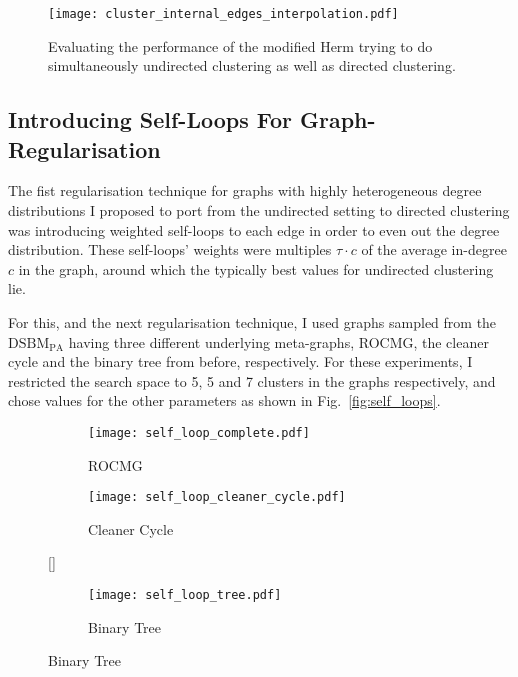 \begin{figure}
\texttt{[image: cluster\_internal\_edges\_interpolation.pdf]}
\caption{Evaluating the performance of the modified Herm trying to do simultaneously undirected 
clustering as well as directed clustering.}
\label{fig:intedginterp}
\end{figure}

\subsection{Introducing Self-Loops For Graph-Regularisation}

The fist regularisation technique for graphs with highly heterogeneous degree distributions I 
proposed to port from the undirected setting to directed clustering was introducing weighted 
self-loops to each edge in order to even out the degree distribution. These self-loops' weights 
were multiples $\tau\cdot c$ of the average in-degree $c$ in the graph, around which the typically 
best values for undirected clustering lie.

For this, and the next regularisation technique, I used graphs sampled from the
 $\mathrm{DSBM}_\mathrm{PA}$ having three different underlying meta-graphs, ROCMG, the cleaner 
cycle and the binary tree from before, respectively. For these experiments, I restricted the 
search space to 5, 5 and 7 clusters in the graphs respectively, and chose values for the other 
parameters as shown in Fig.\ \ref{fig:self_loops}.

\begin{figure}[t!]
\begin{subfigure}[t]{0.45\textwidth}
\begin{center}
\texttt{[image: self\_loop\_complete.pdf]}
\end{center}
\caption{ROCMG}
\end{subfigure}
\begin{subfigure}[t]{0.45\textwidth}
\begin{center}
\texttt{[image: self\_loop\_cleaner\_cycle.pdf]}
\end{center}
\caption{Cleaner Cycle}
\end{subfigure}
[\FBwidth]
{\caption{Impact of introducing weighted self-loops to graph on performance, for the indicated meta-graphs.}\label{fig:self_loops}}{
\begin{subfigure}[t]{0.45\textwidth}
\begin{center}
\texttt{[image: self\_loop\_tree.pdf]}
\end{center}
\caption{Binary Tree}
\end{subfigure}
}
\end{figure}

